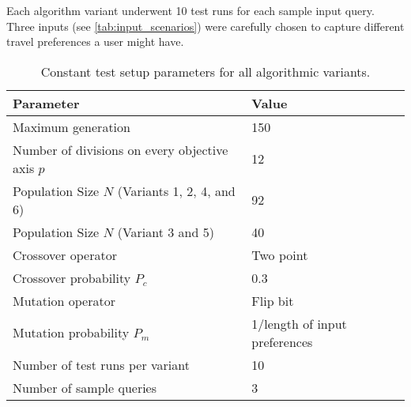 Each algorithm variant underwent 10 test runs for each sample input query. Three inputs (see \ref{tab:input_scenarios}) were carefully chosen to capture different travel preferences a user might have.

\begin{table}[htpb]
  \caption[Test Setup Parameters]{Constant test setup parameters for all algorithmic variants.}\label{tab:alg_parameters}
  \centering
  \begin{tabular}{l l}
    \toprule
       Parameter&Value  \\
    \midrule
      Maximum generation & 150  \\
      Number of divisions on every objective axis $p$& 12  \\
      Population Size $N$ (Variants 1, 2, 4, and 6) & 92   \\
       Population Size $N$ (Variant 3 and 5) & 40   \\
       Crossover operator & Two point \\
      Crossover probability $P_c$ & 0.3  \\
      Mutation operator & Flip bit \\
      Mutation probability $P_m$ & 1/length of input preferences \\
      Number of test runs per variant & 10\\
      Number of sample queries & 3\\
    \bottomrule
  \end{tabular}
\end{table}

